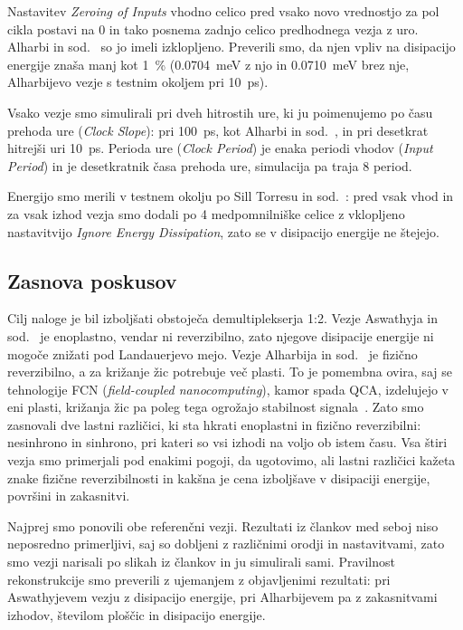 \documentclass[graybox, envcountchap]{svmult}
\begin{document}
Nastavitev \emph{Zeroing of Inputs} vhodno celico pred vsako novo vrednostjo za pol cikla postavi na 0 in tako posnema zadnjo celico predhodnega vezja z uro. Alharbi in sod.~\cite{alharbi2022} so jo imeli izklopljeno. Preverili smo, da njen vpliv na disipacijo energije znaša manj kot \SI{1}{\percent} (\SI{0.0704}{\milli\electronvolt} z njo in \SI{0.0710}{\milli\electronvolt} brez nje, Alharbijevo vezje s testnim okoljem pri \SI{10}{\pico\second}).

Vsako vezje smo simulirali pri dveh hitrostih ure, ki ju poimenujemo po času prehoda ure (\emph{Clock Slope}): pri \SI{100}{\pico\second}, kot Alharbi in sod.~\cite{alharbi2022}, in pri desetkrat hitrejši uri \SI{10}{\pico\second}. Perioda ure (\emph{Clock Period}) je enaka periodi vhodov (\emph{Input Period}) in je desetkratnik časa prehoda ure, simulacija pa traja 8 period.

Energijo smo merili v testnem okolju po Sill Torresu in sod.~\cite{torres2018}: pred vsak vhod in za vsak izhod vezja smo dodali po 4 medpomnilniške celice z vklopljeno nastavitvijo \emph{Ignore Energy Dissipation}, zato se v disipacijo energije ne štejejo.

\subsection{Zasnova poskusov}
\label{g21:sec:poskusi}

Cilj naloge je bil izboljšati obstoječa demultiplekserja 1:2. Vezje Aswathyja in sod.~\cite{aswathy2024} je enoplastno, vendar ni reverzibilno, zato njegove disipacije energije ni mogoče znižati pod Landauerjevo mejo. Vezje Alharbija in sod.~\cite{alharbi2022} je fizično reverzibilno, a za križanje žic potrebuje več plasti. To je pomembna ovira, saj se tehnologije FCN (\emph{field-coupled nanocomputing}), kamor spada QCA, izdelujejo v eni plasti, križanja žic pa poleg tega ogrožajo stabilnost signala~\cite{hien2025}. Zato smo zasnovali dve lastni različici, ki sta hkrati enoplastni in fizično reverzibilni: nesinhrono in sinhrono, pri kateri so vsi izhodi na voljo ob istem času. Vsa štiri vezja smo primerjali pod enakimi pogoji, da ugotovimo, ali lastni različici kažeta znake fizične reverzibilnosti in kakšna je cena izboljšave v disipaciji energije, površini in zakasnitvi.

Najprej smo ponovili obe referenčni vezji. Rezultati iz člankov med seboj niso neposredno primerljivi, saj so dobljeni z različnimi orodji in nastavitvami, zato smo vezji narisali po slikah iz člankov in ju simulirali sami. Pravilnost rekonstrukcije smo preverili z ujemanjem z objavljenimi rezultati: pri Aswathyjevem vezju z disipacijo energije, pri Alharbijevem pa z zakasnitvami izhodov, številom ploščic in disipacijo energije.
\end{document}
